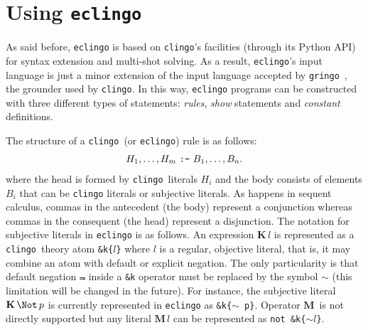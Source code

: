 \documentclass{new_tlp}
\def\K{\mathbf{K}\, }
\def\M{\mathbf{M}\, }
\let\sneg\relax
\newcommand{\sneg}{\ensuremath{\text{-}}}
\def\eclingo{{\tt eclingo}}
\def\clingo{{\tt clingo}}
\def\gringo{{\tt gringo}}
\begin{document}
\section{Using \texttt{eclingo}}
\label{sec:input}

As said before, \eclingo{} is based on \clingo's facilities (through its Python API) for syntax extension and multi-shot solving.
%
As a result, \eclingo's input language is just a minor extension of the input language accepted by \gringo~\cite{gekaosscth09a},
the grounder used by \clingo.
In this way, \eclingo{} programs can be constructed with three different types of statements: \emph{rules}, \emph{show} statements and \emph{constant} definitions.

The structure of a \clingo\ (or \eclingo{}) rule is as follows:
\begin{align*}
    H_1,\dots,H_m  \text{ \texttt{:-} }  B_1,\dots,B_n.
\end{align*}
where the head is formed by \clingo\ literals $H_i$ and
the body consists of elements $B_i$ that can be \clingo{} literals or subjective literals.
%
As happens in sequent calculus, commas in the antecedent (the body) represent a conjunction whereas commas in the consequent (the head) represent a disjunction.
%
The notation for subjective literals in \eclingo{} is as follows.
%
An expression $\K l$ is represented as a \clingo\ theory atom {\tt \&k\{$l$\}} where $l$ is a regular, objective literal, that is, it may combine an atom with default or explicit negation.
%
The only particularity is that default negation $\Not$ inside a {\tt \&k} operator must be replaced by the symbol $\sim$ (this limitation will be changed in the future).
%
For instance, the subjective literal $\K \Not\, \sneg p$ is currently represented in \eclingo{} as \mbox{\tt \&k\{$\sim$\,\sneg p\}}.
%
Operator $\M$ is not directly supported but any literal $\M l$ can be represented as {\tt not \&k\{$\sim l$\}}.
\end{document}
